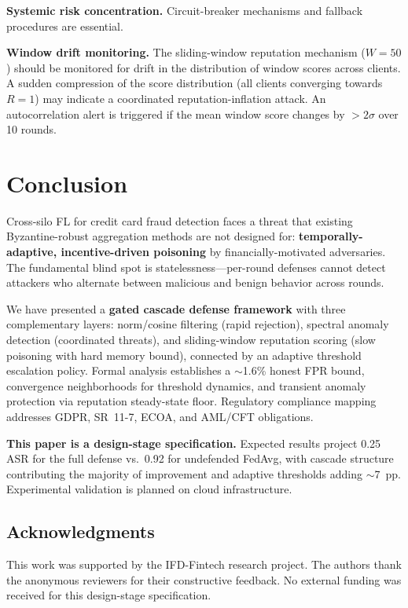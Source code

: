 \documentclass[10pt,journal]{IEEEtran}
\begin{document}
\textbf{Systemic risk concentration.} Circuit-breaker mechanisms and fallback procedures are essential.

\textbf{Window drift monitoring.} The sliding-window reputation mechanism ($W=50$) should be monitored for drift in the distribution of window scores across clients. A sudden compression of the score distribution (all clients converging towards $R=1$) may indicate a coordinated reputation-inflation attack. An autocorrelation alert is triggered if the mean window score changes by $>2\sigma$ over 10 rounds.

\section{Conclusion}
\label{sec:conclusion}

Cross-silo FL for credit card fraud detection faces a threat that existing Byzantine-robust aggregation methods are not designed for: \textbf{temporally-adaptive, incentive-driven poisoning} by financially-motivated adversaries. The fundamental blind spot is statelessness---per-round defenses cannot detect attackers who alternate between malicious and benign behavior across rounds.

We have presented a \textbf{gated cascade defense framework} with three complementary layers: norm/cosine filtering (rapid rejection), spectral anomaly detection (coordinated threats), and sliding-window reputation scoring (slow poisoning with hard memory bound), connected by an adaptive threshold escalation policy. Formal analysis establishes a $\sim$1.6\% honest FPR bound, convergence neighborhoods for threshold dynamics, and transient anomaly protection via reputation steady-state floor. Regulatory compliance mapping addresses GDPR, SR~11-7, ECOA, and AML/CFT obligations.

\textbf{This paper is a design-stage specification.} Expected results project 0.25 ASR for the full defense vs.~0.92 for undefended FedAvg, with cascade structure contributing the majority of improvement and adaptive thresholds adding $\sim$7~pp. Experimental validation is planned on cloud infrastructure.

\subsection*{Acknowledgments}

This work was supported by the IFD-Fintech research project. The authors thank the anonymous reviewers for their constructive feedback. No external funding was received for this design-stage specification.



\end{document}
